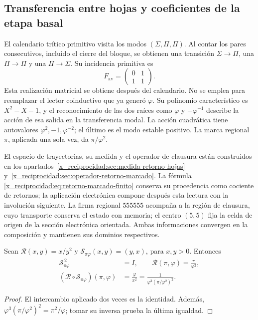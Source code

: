 

\subsection{Transferencia entre hojas y coeficientes de la etapa basal}

El calendario trítico primitivo visita los modos
\((\Sigma,\Pi,\Pi)\). Al contar los pares consecutivos, incluido el
cierre del bloque, se obtienen una transición \(\Sigma\to\Pi\), una
\(\Pi\to\Pi\) y una \(\Pi\to\Sigma\). Su incidencia primitiva es
\[
 F_{\mathrm{av}}=\begin{pmatrix}0&1\\1&1\end{pmatrix}.
\]
Esta realización matricial se obtiene después del calendario. No se
emplea para reemplazar el lector coinductivo que ya generó \(\varphi\).
Su polinomio característico es \(X^2-X-1\), y el reconocimiento de las
dos raíces como \(\varphi\) y \(-\varphi^{-1}\) describe la acción de
esa salida en la transferencia modal. La acción cuadrática tiene autovalores
\(\varphi^2,-1,\varphi^{-2}\); el último es el modo estable positivo.
La marca regional \(\pi\), aplicada una sola vez, da
\(\pi/\varphi^2\).

El espacio de trayectorias, su medida y el operador de clausura están
construidos en los apartados~\ref{x_reciprocidad:sec:medida-retorno-hojas}
y~\ref{x_reciprocidad:sec:operador-retorno-marcado}. La fórmula
\eqref{x_reciprocidad:eq:retorno-marcado-finito} conserva su procedencia como cociente
de retornos; la aplicación electrónica compone después esta lectura
con la involución siguiente. La firma regional \(555555\) acompaña
a la región de clausura, cuyo transporte conserva el estado con memoria;
el centro \((5,5)\) fija la celda de origen de la sección electrónica
orientada. Ambas informaciones convergen en la composición y mantienen
sus dominios respectivos.

\begin{lemma}
Sean \(\mathcal R(x,y)=x/y^2\) y
\(\mathscr S_{\pi\varphi}(x,y)=(y,x)\), para \(x,y>0\).
Entonces
\begin{equation}
 \begin{aligned}
 \mathscr S_{\pi\varphi}^{\,2}&=I,\qquad
 \mathcal R(\pi,\varphi)=\frac{\pi}{\varphi^2},\\
 (\mathcal R\circ\mathscr S_{\pi\varphi})(\pi,\varphi)
 &=\frac{\varphi}{\pi^2}
 =\frac1{\varphi^3(\pi/\varphi^2)^2}.
 \end{aligned}
 \label{x_reciprocidad:eq:el-bisagra}
\end{equation}
\end{lemma}
\begin{proof}
El intercambio aplicado dos veces es la identidad. Además,
\(\varphi^3(\pi/\varphi^2)^2=\pi^2/\varphi\); tomar su inversa prueba
la última igualdad.
\end{proof}

